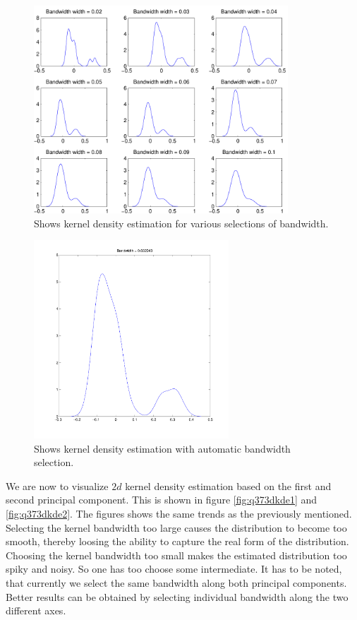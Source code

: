 \begin{figure}[!htbp]
  \centering
  \includegraphics[width=0.85\textwidth]{./images/q37kde}
  \caption{Shows kernel density estimation for various selections of
    bandwidth.}
  \label{fig:q37kde}
\end{figure}

\begin{figure}[!htbp]
  \centering
  \includegraphics[width=0.65\textwidth]{./images/q37kdeauto}
  \caption{Shows kernel density estimation with automatic bandwidth
    selection.}
  \label{fig:q37kdeauto}
\end{figure}

\newpage

We are now to visualize $2d$ kernel density estimation based on the
first and second principal component. This is shown in figure
\ref{fig:q373dkde1} and \ref{fig:q373dkde2}. The figures shows the
same trends as the previously mentioned. Selecting the kernel
bandwidth too large causes the distribution to become too smooth,
thereby loosing the ability to capture the real form of the
distribution. Choosing the kernel bandwidth too small makes the
estimated distribution too spiky and noisy. So one has too choose some
intermediate. It has to be noted, that currently we select the same
bandwidth along both principal components. Better results can be
obtained by selecting individual bandwidth along the two different
axes.

